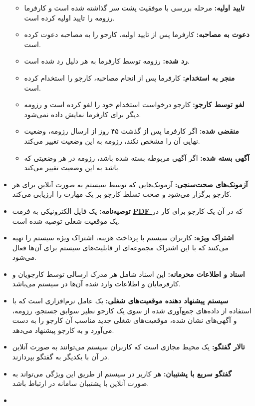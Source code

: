 \documentclass[12pt]{article}
\begin{document}
\begin{itemize}
\begin{itemize}
			\item
			\textbf{تایید اولیه:}
			مرحله بررسی با موفقیت پشت سر گذاشته شده است و کارفرما رزومه را تایید اولیه کرده است.
			\item
			\textbf{دعوت به مصاحبه:}
			کارفرما پس از تایید اولیه، کارجو را به مصاحبه دعوت کرده است.
			\item
			\textbf{رد شده:}
			رزومه توسط کارفرما به هر دلیل رد شده است.
			\item
			\textbf{منجر به استخدام:}
			کارفرما پس از انجام مصاحبه، کارجو را استخدام کرده است.
			\item
			\textbf{لغو توسط کارجو:}
			کارجو درخواست استخدام خود را لغو کرده است و رزومه دیگر برای کارفرما نمایش داده نمی‌شود.
			\item
			\textbf{منقضی شده:}
			اگر کارفرما پس از گذشت ۴۵ روز از ارسال رزومه،‌ وضعیت نهایی آن را مشخص نکند، رزومه به این وضعیت تغییر می‌کند.
			\item
			\textbf{آگهی بسته شده:}
			اگر آگهی مربوطه بسته شده باشد، رزومه در هر وضعیتی که باشد به این وضعیت تغییر می‌کند.
		\end{itemize}
		\item
		\textbf{آزمونک‌های صحت‌سنجی:}
		آزمونک‌هایی که توسط سیستم به صورت آنلاین برای هر کارجو برگزار می‌شود و صحت تسلط کارجو بر یک مهارت را ارزیابی می‌کند.
		\item
		\textbf{توصیه‌نامه:}
		یک فایل الکترونیکی به فرمت \textbf{\hyperref[ref:pdf]{PDF }} که در آن یک کارجو برای کار در یک موقعیت شغلی توصیه شده است.
		\item
		\textbf{اشتراک ویژه:}
		کاربران سیستم با پرداخت هزینه‌‌‌، اشتراک ویژه سیستم را تهیه می‌کنند که با این اشتراک مجموعه‌ای از قابلیت‌های سیستم برای آن‌ها فعال می‌شود.
		\item
		\textbf{اسناد و اطلاعات محرمانه:}
		این اسناد شامل هر مدرک ارسالی توسط کارجویان و کارفرمایان و اطلاعات وارد شده آن‌ها در سیستم می‌باشد.
		\item
		\textbf{سیستم پیشنهاد دهنده موقعیت‌های شغلی:}
		یک عامل نرم‌افزاری است که با استفاده از داده‌های جمع‌آوری شده از سوی یک کارجو نظیر سوابق جستجو، رزومه، و آگهی‌های نشان شده، موقعیت‌های شغلی جدید مناسب آن کارجو را به دست می‌آورد و به کارجو پیشنهاد می‌دهد.
		\item
		\textbf{تالار گفتگو:}
		یک محیط مجازی است که کاربران سیستم می‌توانند به صورت آنلاین در آن با یکدیگر به گفتگو بپردازند.
		\item
		\textbf{گفتگو سریع با پشتیبان:}
		هر کاربر در سیستم از طریق این ویژگی می‌تواند به صورت آنلاین با پشتیبان سامانه در ارتباط باشد.
		\item

\end{itemize}
\end{document}
